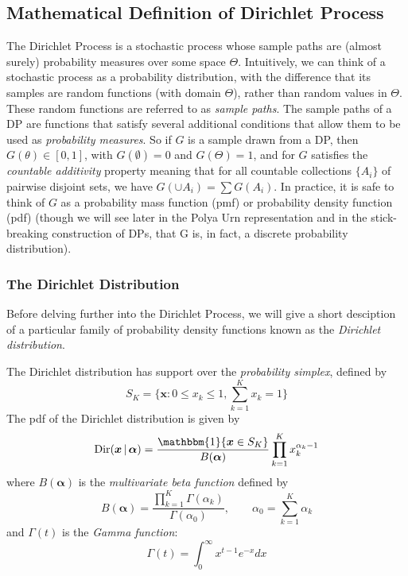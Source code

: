 \documentclass[final,3p,times,twocolumn]{elsarticle}
\DeclareMathOperator*{\Dir}{Dir}
\let\bs\boldsymbol
\begin{document}
\subsection{Mathematical Definition of Dirichlet Process}
The Dirichlet Process is a stochastic process whose sample paths are (almost surely) probability measures over some space $\Theta$.
Intuitively, we can think of a stochastic process as a probability distribution, with the difference that its samples are random functions (with domain $\Theta$), rather than random values in $\Theta$.
These random functions are referred to as \emph{sample paths}.
The sample paths of a DP are functions that satisfy several additional conditions that allow them to be used as \emph{probability measures}. 
So if $G$ is a sample drawn from a DP, then $G(\theta) \in [0,1]$, with $G(\emptyset) = 0$ and $G(\Theta) = 1$, and for $G$ satisfies the \emph{countable additivity} property meaning that for all countable collections $\{A_i\}$ of pairwise disjoint sets, we have $G(\cup A_i) = \sum G(A_i)$.
In practice, it is safe to think of $G$ as a probability mass function (pmf) or probability density function (pdf) (though we will see later in the Polya Urn representation and in the stick-breaking construction of DPs, that G is, in fact, a discrete probability distribution).

\subsubsection{The Dirichlet Distribution}
Before delving further into the Dirichlet Process, we will give a short desciption of a particular family of probability density functions known as the \emph{Dirichlet distribution}.

The Dirichlet distribution has support over the \emph{probability simplex}, defined by
\begin{equation}
S_K = \{\boldsymbol x : 0 \leq x_k \leq 1, \sum_{k=1}^K x_k = 1\}
\label{eqn:simplex}
\end{equation}
The pdf of the Dirichlet distribution is given by 
\begin{equation}
\label{eqn:dirpdf}
\Dir(\bs x \,|\, \boldsymbol \alpha) = \frac{\mathbbm{1}\{\boldsymbol x \in S_K\}}{B(\boldsymbol \alpha)}\prod_{k=1}^K x_k^{\alpha_k - 1}
\end{equation}
where $B(\boldsymbol \alpha)$ is the \emph{multivariate beta function} defined by
\begin{equation}
\label{eqn:mvbeta}
B(\bs \alpha) = \frac{\prod_{k=1}^K \Gamma(\alpha_k)}{\Gamma(\alpha_0)},
\qquad \alpha_0 = \sum_{k=1}^K \alpha_k
\end{equation}
and $\Gamma(t)$ is the \emph{Gamma function}:
\begin{equation}
\label{eqn:gamma}
\Gamma(t) = \int_0^\infty x^{t-1}e^{-x}dx
\end{equation}
\end{document}
